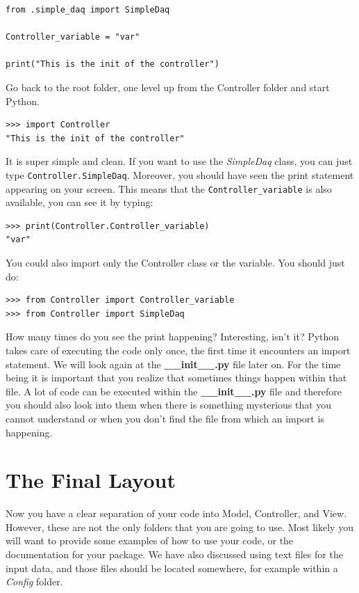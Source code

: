 \begin{verbatim}
from .simple_daq import SimpleDaq

Controller_variable = "var"

print("This is the init of the controller")
\end{verbatim}

Go back to the root folder, one level up from the Controller folder and
start Python.

\begin{verbatim}
>>> import Controller
"This is the init of the controller"
\end{verbatim}

It is super simple and clean. If you want to use the \emph{SimpleDaq}
class, you can just type \texttt{Controller.SimpleDaq}. Moreover, you
should have seen the print statement appearing on your screen. This
means that the \texttt{Controller_variable} is also available, you can
see it by typing:

\begin{verbatim}
>>> print(Controller.Controller_variable)
"var"
\end{verbatim}

You could also import only the Controller class or the variable. You
should just do:

\begin{verbatim}
>>> from Controller import Controller_variable
>>> from Controller import SimpleDaq
\end{verbatim}

How many times do you see the print happening? Interesting, isn't it?
Python takes care of executing the code only once, the first time it
encounters an import statement. We will look again at the
\textbf{\_\_init\_\_.py} file later on. For the time being it is
important that you realize that sometimes things happen within that
file. A lot of code can be executed within the \textbf{\_\_init\_\_.py}
file and therefore you should also look into them when there is
something mysterious that you cannot understand or when you don't find
the file from which an import is happening.


\section{The Final Layout}\label{the-finallayout}
Now you have a clear separation of your code into Model, Controller, and
View. However, these are not the only folders that you are going to use.
Most likely you will want to provide some examples of how to use your
code, or the documentation for your package. We have also discussed
using text files for the input data, and those files should be located
somewhere, for example within a \emph{Config} folder.

